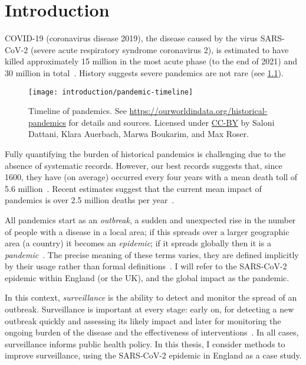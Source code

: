 \documentclass[thesis.tex]{subfiles}
\begin{document}
\chapter{Introduction} \label{intro}

COVID-19 (coronavirus disease 2019), the disease caused by the virus SARS-CoV-2 (severe acute respiratory syndrome coronavirus 2), is estimated to have killed approximately 15 million in the most acute phase (to the end of 2021) and 30 million in total~\autocite{whoCOVIDExcess,economistCOVIDExcess}.
History suggests severe pandemics are not rare (see \cref{intro:fig:pandemic-timeline}).
\begin{figure}
    \texttt{[image: introduction/pandemic-timeline]}
    \caption[Timeline of pandemics.]{%
        Timeline of pandemics.
        See \url{https://ourworldindata.org/historical-pandemics} for details and sources.
        Licensed under \href{https://creativecommons.org/licenses/by/4.0/}{CC-BY} by Saloni Dattani, Klara Auerbach, Marwa Boukarim, and Max Roser.
    }
    \label{intro:fig:pandemic-timeline}
\end{figure}
Fully quantifying the burden of historical pandemics is challenging due to the absence of systematic records.
However, our best records suggests that, since 1600, they have (on average) occurred every four years with a mean death toll of 5.6 million~\autocite{maraniNovelEpidemics}.
Recent estimates suggest that the current mean impact of pandemics is over 2.5 million deaths per year~\autocite{madhavPandemicMortality}.

All pandemics start as an \emph{outbreak}, a sudden and unexpected rise in the number of people with a disease in a local area; if this spreads over a larger geographic area (\eg a country) it becomes an \emph{epidemic}; if it spreads globally then it is a \emph{pandemic}~\autocite{grennanPandemic}.
The precise meaning of these terms varies, they are defined implicitly by their usage rather than formal definitions~\autocite{morensPandemic,doshiElusive}.
I will refer to the SARS-CoV-2 epidemic within England (or the UK), and the global impact as the pandemic.

In this context, \emph{surveillance} is the ability to detect and monitor the spread of an outbreak.
Surveillance is important at every stage: early on, for detecting a new outbreak quickly and assessing its likely impact and later for monitoring the ongoing burden of the disease and the effectiveness of interventions~\autocite{whoFluSurveillance}.
In all cases, surveillance informs public health policy.
In this thesis, I consider methods to improve surveillance, using the SARS-CoV-2 epidemic in England as a case study.
\end{document}
